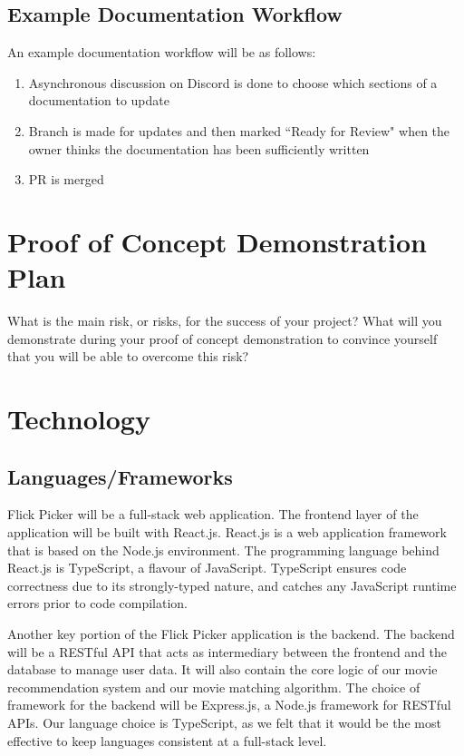 \documentclass{article}
\begin{document}
\subsection{Example Documentation Workflow}
An example documentation workflow will be as follows:
\begin{enumerate}
	\item Asynchronous discussion on Discord is done to choose which sections of a documentation to update
	\item Branch is made for updates and then marked ``Ready for Review" when the owner thinks the documentation has been sufficiently written
	\item PR is merged
\end{enumerate}

\section{Proof of Concept Demonstration Plan}

What is the main risk, or risks, for the success of your project?  What will you
demonstrate during your proof of concept demonstration to convince yourself that
you will be able to overcome this risk?

\section{Technology}
	

\subsection{Languages/Frameworks}

Flick Picker will be a full-stack web application. The frontend layer of the application will be built with React.js. React.js is a web application framework that is based on the Node.js environment. The programming language behind React.js is TypeScript, a flavour of JavaScript. TypeScript ensures code correctness due to its strongly-typed nature, and catches any JavaScript runtime errors prior to code compilation.

Another key portion of the Flick Picker application is the backend. The backend will be a RESTful API that acts as intermediary between the frontend and the database to manage user data. It will also contain the core logic of our movie recommendation system and our movie matching algorithm. The choice of framework for the backend will be Express.js, a Node.js framework for RESTful APIs. Our language choice is TypeScript, as we felt that it would be the most effective to keep languages consistent at a full-stack level.
\end{document}
